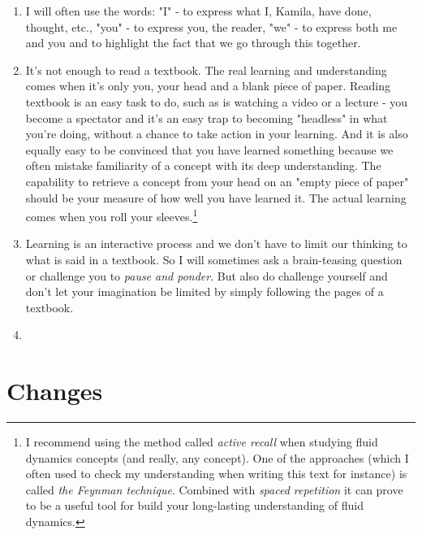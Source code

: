 \documentclass[10pt]{report}
\begin{document}
\begin{enumerate}
\item I will often use the words: "I" - to express what I, Kamila, have done, thought, etc., "you" - to express you, the reader, "we" - to express both me and you and to highlight the fact that we go through this together.
\item It's not enough to read a textbook. The real learning and understanding comes when it's only you, your head and a blank piece of paper. Reading textbook is an easy task to do, such as is watching a video or a lecture - you become a spectator and it's an easy trap to becoming "headless" in what you're doing, without a chance to take action in your learning.  And it is also equally easy to be convinced that you have learned something because we often mistake familiarity of a concept with its deep understanding. The capability to retrieve a concept from your head on an "empty piece of paper" should be your measure of how well you have learned it. The actual learning comes when you roll your sleeves.\footnote{I recommend using the method called \textit{active recall} when studying fluid dynamics concepts (and really, any concept). One of the approaches (which I often used to check my understanding when writing this text for instance) is called \textit{the Feynman technique}. Combined with \textit{spaced repetition} it can prove to be a useful tool for build your long-lasting understanding of fluid dynamics.}
\item Learning is an interactive process and we don't have to limit our thinking to what is said in a textbook. So I will sometimes ask a brain-teasing question or challenge you to \textit{pause and ponder}. But also do challenge yourself and don't let your imagination be limited by simply following the pages of a textbook.
\item 
\end{enumerate}

\chapter{Changes}




\end{document}

